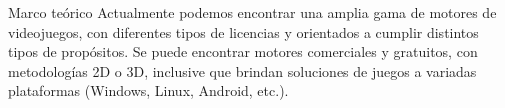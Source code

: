 \begin{thesischapter}{1} {Marco teórico}
    Actualmente podemos encontrar una amplia gama de motores de videojuegos, con diferentes tipos de licencias y orientados a cumplir distintos tipos de propósitos. Se puede encontrar motores comerciales y gratuitos, con metodologías 2D o 3D, inclusive que brindan soluciones de juegos a variadas plataformas (Windows, Linux, Android, etc.).\\ 
    
    

\end{thesischapter}
